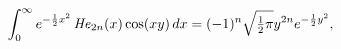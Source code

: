 \[\int_{0}^{\infty}e^{-\frac{1}{2}x^{2}}\mathop{\mathit{He}_{2n}\/}\nolimits\!%
\left(x\right)\mathop{\cos\/}\nolimits\!\left(xy\right)dx=(-1)^{n}\sqrt{\tfrac%
{1}{2}\pi}y^{2n}e^{-\frac{1}{2}y^{2}},\]